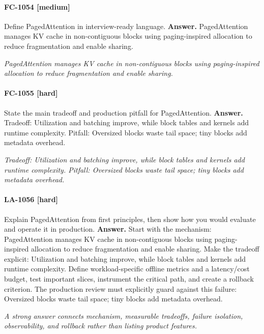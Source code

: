 \paragraph{FC-1054 [medium]} Define PagedAttention in interview-ready language.
\noindent\textbf{Answer.} PagedAttention manages KV cache in non-contiguous blocks using paging-inspired allocation to reduce fragmentation and enable sharing.
\par\textit{PagedAttention manages KV cache in non-contiguous blocks using paging-inspired allocation to reduce fragmentation and enable sharing.}
\paragraph{FC-1055 [hard]} State the main tradeoff and production pitfall for PagedAttention.
\noindent\textbf{Answer.} Tradeoff: Utilization and batching improve, while block tables and kernels add runtime complexity. Pitfall: Oversized blocks waste tail space; tiny blocks add metadata overhead.
\par\textit{Tradeoff: Utilization and batching improve, while block tables and kernels add runtime complexity. Pitfall: Oversized blocks waste tail space; tiny blocks add metadata overhead.}
\paragraph{LA-1056 [hard]} Explain PagedAttention from first principles, then show how you would evaluate and operate it in production.
\noindent\textbf{Answer.} Start with the mechanism: PagedAttention manages KV cache in non-contiguous blocks using paging-inspired allocation to reduce fragmentation and enable sharing. Make the tradeoff explicit: Utilization and batching improve, while block tables and kernels add runtime complexity. Define workload-specific offline metrics and a latency/cost budget, test important slices, instrument the critical path, and create a rollback criterion. The production review must explicitly guard against this failure: Oversized blocks waste tail space; tiny blocks add metadata overhead.
\par\textit{A strong answer connects mechanism, measurable tradeoffs, failure isolation, observability, and rollback rather than listing product features.}
